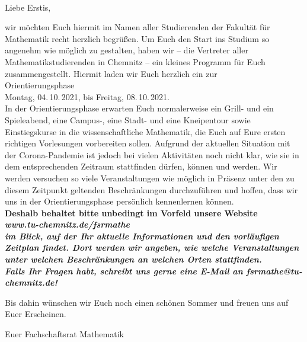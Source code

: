 \documentclass[nkz,einrichtung,usemycontact]{tucletter2019}
\begin{document}
	
\begin{letter}{%
\, \\
}

\opening{Liebe Erstis,}

wir möchten Euch hiermit im Namen aller Studierenden der Fakultät für Mathematik recht herzlich begrüßen.
Um Euch den Start ins Studium so angenehm wie möglich zu gestalten, haben wir -- die Vertreter aller Mathematikstudierenden in Chemnitz -- ein kleines Programm für Euch zusammengestellt. Hiermit laden wir Euch herzlich ein zur \\[10pt]

\hspace*{\fill} \Large Orientierungsphase \hspace*{\fill} \\
\hspace*{\fill} Montag, 04.\,10.\,2021, bis Freitag, 08.\,10.\,2021. \normalsize \hspace*{\fill} \\[12pt]

In der Orientierungsphase erwarten Euch normalerweise ein Grill- und ein Spieleabend, eine Campus-, eine Stadt- und eine Kneipentour sowie Einstiegskurse in die wissenschaftliche Mathematik, die Euch auf Eure ersten richtigen Vorlesungen vorbereiten sollen. Aufgrund der aktuellen Situation mit der Corona-Pandemie ist jedoch bei vielen Aktivitäten noch nicht klar, wie sie in dem entsprechenden Zeitraum stattfinden dürfen, können und werden. Wir werden versuchen so viele Veranstaltungen wie möglich in Präsenz unter den zu diesem Zeitpunkt geltenden Beschränkungen durchzuführen und hoffen, dass wir uns in der Orientierungsphase persönlich kennenlernen können. \\[10pt] 

\bfseries Deshalb behaltet bitte unbedingt im Vorfeld unsere Website \\[6pt]
\hspace*{\fill} \Large \itshape \textbf{www.tu-chemnitz.de/fsrmathe} \upshape \normalsize \hspace*{\fill} \\[6pt]
im Blick, auf der Ihr aktuelle Informationen und den vorläufigen Zeitplan findet. Dort werden wir angeben, wie welche Veranstaltungen unter welchen Beschränkungen an welchen Orten stattfinden. \mdseries \\[12pt]

Falls Ihr Fragen habt, schreibt uns gerne eine E-Mail an \itshape\textbf{fsrmathe@tu-chemnitz.de}\upshape!

Bis dahin wünschen wir Euch noch einen schönen Sommer und freuen uns auf Euer Erscheinen.

Euer Fachschaftsrat Mathematik

\end{letter}
\end{document}
